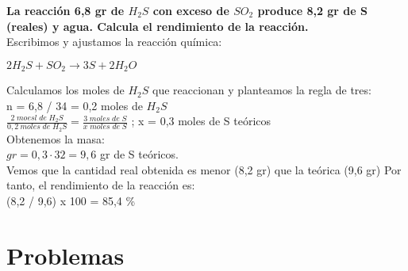 \begin{exercise}
	\textbf{La reacción 6,8 gr de $H_2S$ con exceso de $SO_2$ produce 8,2 gr de S (reales) y agua. Calcula el rendimiento de la reacción.}\\
	
	Escribimos y ajustamos la reacción química:\\
	\begin{center}
		$2H_2S + SO_2 \longrightarrow 3S + 2H_2O$\\
	\end{center}
	
	Calculamos los moles de $H_2S$ que reaccionan y planteamos la regla de tres:\\
	
	n = 6,8 / 34 = 0,2 moles de $H_2S$\\
	
	$\frac{2\; moesl\; de\; H_2S}{0,2\: moles\; de\; H_2S}=\frac{3 \; moles\; de\; S}{x \; moles\; de\; S}$ ; x = 0,3 moles de S teóricos\\


Obtenemos la masa:\\

$gr = 0,3 \cdot 32 = 9,6$ gr de S teóricos.\\

Vemos que la cantidad real obtenida es menor (8,2 gr) que la teórica (9,6 gr) Por tanto, el rendimiento de la reacción es:\\

(8,2 / 9,6) x 100 = 85,4 \% 

\end{exercise}

\newpage

\section{Problemas}

